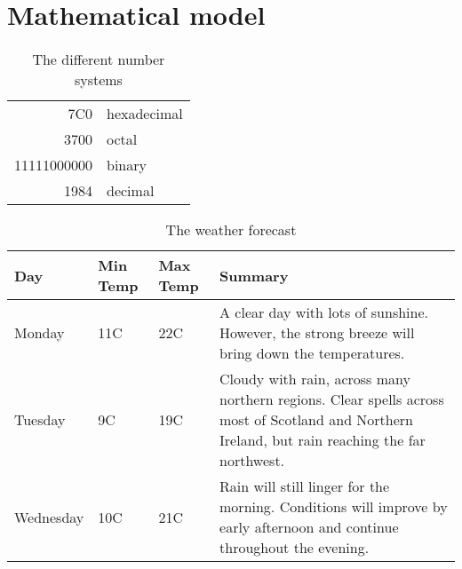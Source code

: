 \documentclass[%
    norsk,  %
]{USN-BSc}
\begin{document}
\section{Mathematical model}
\label{sec:mathmodel}
\lipsum[8]
\begin{table}[!ht]
  \caption{The different number systems}
  \centering
  \begin{tabular}{|r|l|}
    \hline
    7C0 & hexadecimal \\
    3700 & octal \\ \cline{2-2}
    11111000000 & binary \\
    \hline \hline
    1984 & decimal \\
    \hline
  \end{tabular}
\end{table}

\lipsum[4]

\begin{table}[!ht]
 \caption{The weather forecast}
  \centering
   \begin{tabular}{ | l | l | l | p{5cm} |}
    \hline
    Day & Min Temp & Max Temp & Summary \\ \hline
    Monday & 11C & 22C & A clear day with lots of sunshine.
    However, the strong breeze will bring down the temperatures. \\ \hline
    Tuesday & 9C & 19C & Cloudy with rain, across many northern regions. Clear spells
    across most of Scotland and Northern Ireland,
    but rain reaching the far northwest. \\ \hline
    Wednesday & 10C & 21C & Rain will still linger for the morning.
    Conditions will improve by early afternoon and continue
    throughout the evening. \\
    \hline
    \end{tabular}
\end{table}


~\nocite{*}

\cleardoublepage

\printbibliography[heading=bibintoc]


\appendix
\renewcommand{\appendixname}{Paper} %
\end{document}
